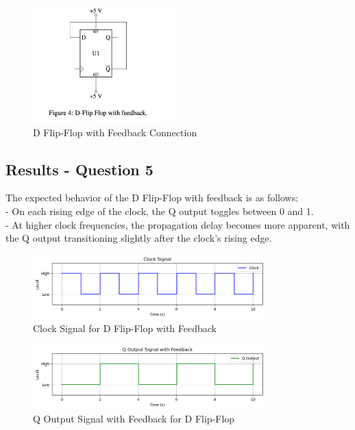 \documentclass{article}
\begin{document}
    \begin{figure}[H]
        \centering
        \includegraphics[width=0.5\textwidth]{./img/Lab 11/11_5_1.png}  
        \caption{D Flip-Flop with Feedback Connection}
        \label{fig:Feedback_Circuit}
    \end{figure}
    
    \subsection*{\textbf{Results - Question 5}}
    The expected behavior of the D Flip-Flop with feedback is as follows: \\ 
       - On each rising edge of the clock, the Q output toggles between 0 and 1. \\
       - At higher clock frequencies, the propagation delay becomes more apparent, with the Q output transitioning slightly after the clock’s rising edge. \\ 
    
    \begin{figure}[H]
        \centering
        \includegraphics[width=0.8\textwidth]{./img/Lab 11/11_5_2.png}  
        \caption{Clock Signal for D Flip-Flop with Feedback}
        \label{fig:Clock_Signal_Feedback}
    \end{figure}
    
    \begin{figure}[H]
        \centering
        \includegraphics[width=0.8\textwidth]{./img/Lab 11/11_5_3.png}  %
        \caption{Q Output Signal with Feedback for D Flip-Flop}
        \label{fig:Q_Output_Feedback}
    \end{figure}
    
\end{document}
